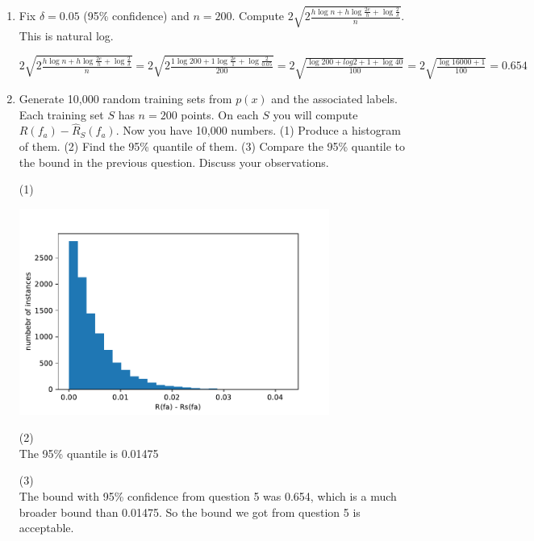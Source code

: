 \documentclass[a4paper]{article}
\theoremstyle{definition}
\newenvironment{soln}{
    \leavevmode\color{blue}\ignorespaces
}{}
\begin{document}
\begin{enumerate}
\item Fix $\delta=0.05$ (95\% confidence) and $n=200$.  Compute 
$2 \sqrt{2 \frac{h \log n + h \log\frac{2e}{h}  + \log \frac{2}{\delta} }{n}}.$
This is natural log.

\begin{soln}
$2 \sqrt{2 \frac{h \log n + h \log\frac{2e}{h}  + \log \frac{2}{\delta} }{n}} = 2 \sqrt{2 \frac{1 \log 200 + 1 \log\frac{2e}{1}  + \log \frac{2}{0.05} }{200}} = 2 \sqrt{ \frac{ \log 200 + log2 + 1 + \log 40}{100}} =  2 \sqrt{ \frac{ \log 16000 + 1}{100}} =0.654$
\end{soln}

\item Generate 10,000 random training sets from $p(x)$ and the associated labels.  Each training set $S$ has $n=200$ points.
On each $S$ you will compute $R(f_a) - \hat R_S(f_a)$.
Now you have 10,000 numbers. (1) Produce a histogram of them.  (2) Find the 95\% quantile of them.  (3) Compare the 95\% quantile to the bound in the previous question.  Discuss your observations.

\begin{soln}
(1)\\
\begin{center}
	\includegraphics[width=4in]{q26}
\end{center}

(2)\\
The 95\% quantile is 0.01475

(3)\\
The bound with 95\% confidence from question 5 was 0.654, which is a much broader bound than 0.01475. So the bound we got from question 5 is acceptable.

\end{soln}


\end{enumerate}
\end{document}
